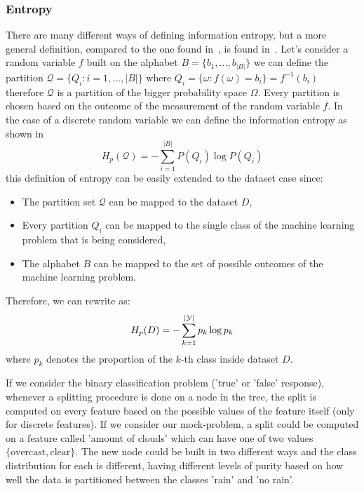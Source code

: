 \subsubsection{Entropy}
There are many different ways of defining information entropy, but a more general definition, compared
to the one found in~\cite{ZhouZhi-Hua2021ML}, is found in~\cite{gray2011entropy}. Let's consider a
random variable $f$ built on the alphabet $B = \{b_1, \ldots, b_{|B|}\}$ we can define the
partition $\mathcal{Q} = \{Q_i: i = 1, \ldots, |B|\}$ where $Q_i = \{\omega: f(\omega) = b_i\} = f^{-1}(b_i)$ therefore $\mathcal{Q}$ is a partition of the bigger
probability space $\Omega$. Every partition is chosen based on the outcome of the measurement of the random variable $f$. In the case of a discrete random variable we can define the information entropy as shown in 
\begin{equation}
	\label{eq:information-entropy}
	H_p(\mathcal{Q}) = - \sum_{i = 1}^{|B|}{P(Q_i)\log{P(Q_i)}}
\end{equation}
this definition of entropy can be easily extended to the dataset case since:
\begin{itemize}
	\item The partition set $\mathcal{Q}$ can be mapped to the dataset $D$,
	\item Every partition $Q_i$ can be mapped to the single class of the machine learning
	      problem that is being considered,
	\item The alphabet $B$ can be mapped to the set of possible outcomes of the machine learning
	      problem.
\end{itemize}
Therefore, we can rewrite  as:
\begin{equation}
	H_p(D) = - \sum_{k = 1}^{|\mathcal{Y}|}p_k \log{p_k}
\end{equation}
where $p_k$ denotes the proportion of the $k$-th class inside dataset $D$.

\medskip

If we consider the binary classification problem ('true' or 'false' response), whenever a splitting procedure
is done on a node in the tree, the split is computed on every feature based on the possible
values of the feature itself (only for discrete features). If we consider our mock-problem, a split
could be computed on a feature called 'amount of clouds' which can have one of two values
$\{\text{overcast}, \text{clear}\}$. The new node could be built in two different ways and the class distribution for each is different, having different levels of purity based on how well the data is partitioned between the classes 'rain' and 'no rain'.

